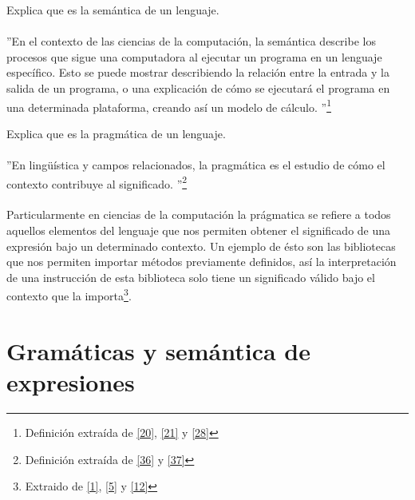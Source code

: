     \begin{exercise}
       Explica que es la semántica de un lenguaje.    \\\\
        ''En el contexto de las ciencias de la computación, la semántica describe los procesos que sigue una computadora al ejecutar un programa en un lenguaje específico. Esto se puede mostrar describiendo la relación entre la entrada y la salida de un programa, o una explicación de cómo se ejecutará el programa en una determinada plataforma, creando así un modelo de cálculo. ''\footnote{Definición extraída de \hyperlink{20}{[20]},  \hyperlink{21}{[21]} y \hyperlink{28}{[28]}}
    \end{exercise} 


    \begin{exercise}
        Explica que es la pragmática de un lenguaje.   \\\\
         ''En lingüística y campos relacionados, la pragmática es el estudio de cómo el contexto contribuye al significado. ''\footnote{Definición extraída de  \hyperlink{36}{[36]} y \hyperlink{37}{[37]}}\\\\
        Particularmente en ciencias de la computación la prágmatica se refiere a todos aquellos elementos del lenguaje que nos permiten obtener el significado de una expresión bajo un determinado contexto.
        Un ejemplo de ésto son las bibliotecas que nos permiten importar métodos previamente definidos, así la interpretación de una instrucción de esta biblioteca solo tiene un significado válido bajo el contexto que la importa\footnote{Extraido de  \hyperlink{1}{[1]},  \hyperlink{5}{[5]} y   \hyperlink{12}{[12]}}.
    \end{exercise} 

    \bigskip

\section{Gramáticas y semántica de expresiones}

